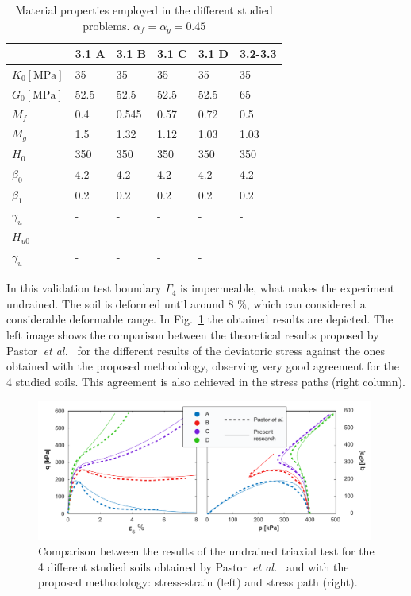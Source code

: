 \documentclass[preprint,12pt,a4paper]{elsarticle}
\begin{document}
\begin{table}
\caption{\label{tab3} Material properties employed in the different studied problems. $\alpha_f=\alpha_g=0.45$} 
\centering
	\begin{tabular}{l|l|l|l|l|l}
	& 3.1 A  & 3.1 B & 3.1 C & 3.1 D & 3.2-3.3 \\
	\hline
        $K_{0} \left[ \text{MPa} \right]$  & 35 & 35 & 35 & 35 & 35
        \\ 
        $G_{0} \left[ \text{MPa} \right]$ & 52.5 & 52.5 & 52.5 & 52.5 & 65
        \\
        \(M_{f}\)  & 0.4 & 0.545 & 0.57 & 0.72 & 0.5
        \\
        \(M_{g}\) & 1.5 & 1.32 & 1.12 & 1.03 & 1.03
        \\
        \(H_{0}\) & 350 & 350 & 350 & 350 & 350
        \\
        \(\beta_{0}\) & 4.2 & 4.2 & 4.2 & 4.2 & 4.2
        \\
        \(\beta_{1}\) & 0.2 & 0.2 & 0.2 & 0.2 & 0.2
        \\
        \( \gamma_{u}\)  & - & - & - & - & - 
        \\
        \(H_{u 0}\) & - & - & - & - & - 
        \\
        \( \gamma_{u}\)  & - & - & - & -
        \\
	\end{tabular}
\end{table}

In this validation test boundary $\Gamma_4$ is impermeable, what makes the experiment undrained. The soil is deformed until around 8 \%, which can considered a considerable deformable range. In Fig.~\ref{fig_undrained} the obtained results are depicted. The left image shows the comparison between the theoretical results proposed by Pastor~\textit{et al.}~\cite{PastorZC:90} for the different results of the deviatoric stress against the ones obtained with the proposed methodology, observing very good agreement for the 4 studied soils. This agreement is also achieved in the stress paths (right column).

\begin{figure}
\centering
\includegraphics[width=0.99\textwidth]{Figs/undrained.pdf}
\caption{Comparison between the results of the undrained triaxial test for the 4 different studied soils obtained by Pastor~\textit{et al.}~\cite{PastorZC:90} and with the proposed methodology: stress-strain (left) and stress path (right).}
\label{fig_undrained}
\end{figure}
\end{document}
